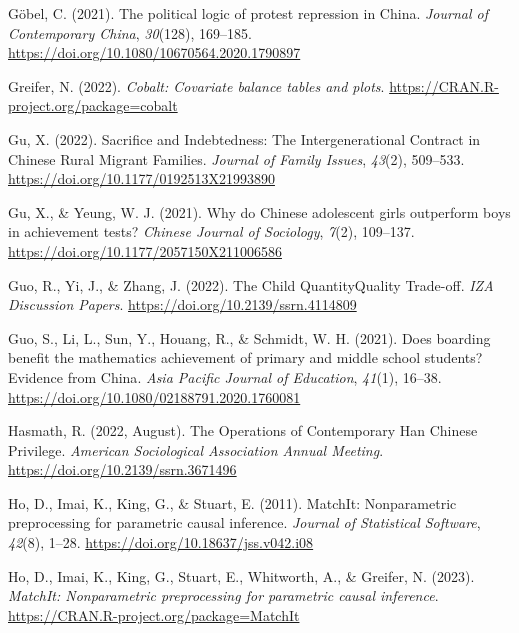 \documentclass[
  man,floatsintext]{apa7}
\newlength{\cslhangindent}
\newlength{\cslentryspacingunit} %
\newenvironment{CSLReferences}[2] %
 {%
  \setlength{\parindent}{0pt}
  \ifodd #1
  \let\oldpar\par
  \def\par{\hangindent=\cslhangindent\oldpar}
  \fi
  \setlength{\parskip}{#2\cslentryspacingunit}
 }%
 {}
\begin{document}
\begin{CSLReferences}{1}{0}
\leavevmode{}%
Göbel, C. (2021). The political logic of protest repression in {China}. \emph{Journal of Contemporary {China}}, \emph{30}(128), 169--185. \url{https://doi.org/10.1080/10670564.2020.1790897}

\leavevmode{}%
Greifer, N. (2022). \emph{Cobalt: Covariate balance tables and plots}. \url{https://CRAN.R-project.org/package=cobalt}

\leavevmode{}%
Gu, X. (2022). Sacrifice and Indebtedness: The Intergenerational Contract in Chinese Rural Migrant Families. \emph{Journal of Family Issues}, \emph{43}(2), 509--533. \url{https://doi.org/10.1177/0192513X21993890}

\leavevmode{}%
Gu, X., \& Yeung, W. J. (2021). Why do Chinese adolescent girls outperform boys in achievement tests? \emph{Chinese Journal of Sociology}, \emph{7}(2), 109--137. \url{https://doi.org/10.1177/2057150X211006586}

\leavevmode{}%
Guo, R., Yi, J., \& Zhang, J. (2022). The Child Quantity{\textendash}Quality Trade-off. \emph{IZA Discussion Papers}. \url{https://doi.org/10.2139/ssrn.4114809}

\leavevmode{}%
Guo, S., Li, L., Sun, Y., Houang, R., \& Schmidt, W. H. (2021). Does boarding benefit the mathematics achievement of primary and middle school students? Evidence from {China}. \emph{Asia Pacific Journal of Education}, \emph{41}(1), 16--38. \url{https://doi.org/10.1080/02188791.2020.1760081}

\leavevmode{}%
Hasmath, R. (2022, August). The Operations of Contemporary Han Chinese Privilege. \emph{American Sociological Association Annual Meeting}. \url{https://doi.org/10.2139/ssrn.3671496}

\leavevmode{}%
Ho, D., Imai, K., King, G., \& Stuart, E. (2011). {MatchIt}: Nonparametric preprocessing for parametric causal inference. \emph{Journal of Statistical Software}, \emph{42}(8), 1--28. \url{https://doi.org/10.18637/jss.v042.i08}

\leavevmode{}%
Ho, D., Imai, K., King, G., Stuart, E., Whitworth, A., \& Greifer, N. (2023). \emph{MatchIt: Nonparametric preprocessing for parametric causal inference}. \url{https://CRAN.R-project.org/package=MatchIt}


\end{CSLReferences}
\end{document}
